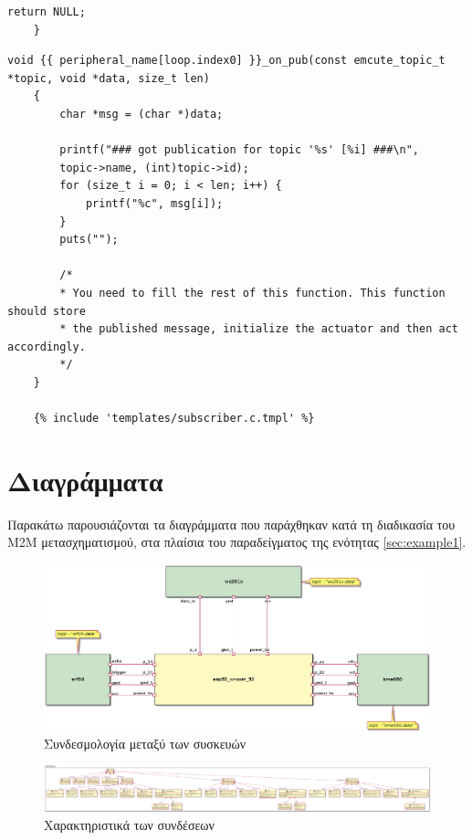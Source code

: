 \begin{appendices}
\begin{lstlisting}[style=CStyle, title={Πρότυπο παραγωγής κώδικα για μη υποστηριζόμενο αισθητήρα}]
		return NULL;
	}
\end{lstlisting}

\begin{lstlisting}[style=CStyle, title={Πρότυπο παραγωγής κώδικα για μη υποστηριζόμενο ενεργοποιητή}]
	void {{ peripheral_name[loop.index0] }}_on_pub(const emcute_topic_t *topic, void *data, size_t len)
	{
		char *msg = (char *)data;
		
		printf("### got publication for topic '%s' [%i] ###\n",
		topic->name, (int)topic->id);
		for (size_t i = 0; i < len; i++) {
			printf("%c", msg[i]);
		}
		puts("");
		
		/*
		* You need to fill the rest of this function. This function should store
		* the published message, initialize the actuator and then act accordingly. 
		*/ 
	}
	
	{% include 'templates/subscriber.c.tmpl' %}
\end{lstlisting}

\chapter{Διαγράμματα}
\label{appendix:diagrams}

Παρακάτω παρουσιάζονται τα διαγράμματα που παράχθηκαν κατά τη διαδικασία του M2M μετασχηματισμού, στα πλαίσια του παραδείγματος της ενότητας \autoref{sec:example1}.

\begin{figure}[!ht]
	\centering
	\includegraphics[width=1.0\textwidth]{./images/chapter6/example1a.png}
	\caption{Συνδεσμολογία μεταξύ των συσκευών}
	\label{fig:diagram_1}
\end{figure}

\begin{figure}[!ht]
	\centerline{\includegraphics[width=0.9\paperwidth]{./images/chapter6/example1b.png}}
	\caption{Χαρακτηριστικά των συνδέσεων}
	\label{fig:diagram_2}
\end{figure}

\end{appendices}